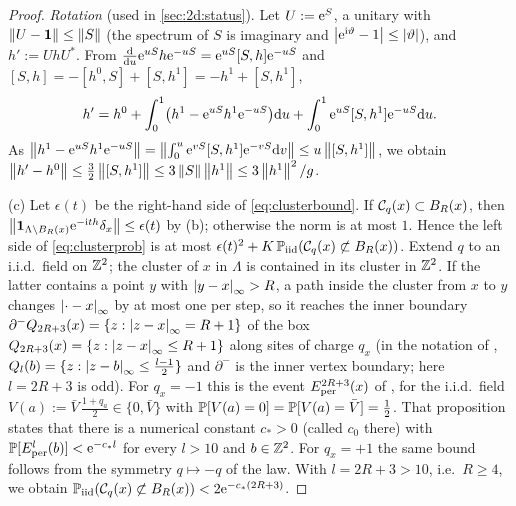 \begin{proof}
\emph{Rotation} (used in \cref{sec:2d:status}).  Let $U:=\mathrm{e}^S$, a unitary with $\left\|U-\mathbf{1}\right\|\le\left\|S\right\|$ (the
spectrum of $S$ is imaginary and $\left|\mathrm{e}^{\mathrm{i}\vartheta}-1\right|\le\left|\vartheta\right|$), and $h':=UhU^*$.  From
$\frac{\mathrm{d}}{\mathrm{d} u}\mathrm{e}^{uS}h\mathrm{e}^{-uS}=\mathrm{e}^{uS}[S,h]\mathrm{e}^{-uS}$ and $[S,h]=-[h^0,S]+[S,h^1]=-h^1+[S,h^1]$,
\[
  h'=h^0+\int_0^1\bigl(h^1-\mathrm{e}^{uS}h^1\mathrm{e}^{-uS}\bigr)\mathrm{d} u+\int_0^1\mathrm{e}^{uS}[S,h^1]\mathrm{e}^{-uS}\mathrm{d} u .
\]
As $\left\|h^1-\mathrm{e}^{uS}h^1\mathrm{e}^{-uS}\right\|=\left\|\int_0^u\mathrm{e}^{vS}[S,h^1]\mathrm{e}^{-vS}\mathrm{d} v\right\|\le u\left\|[S,h^1]\right\|$, we obtain
$\left\|h'-h^0\right\|\le\frac32\left\|[S,h^1]\right\|\le3\left\|S\right\|\left\|h^1\right\|\le3\left\|h^1\right\|^2/g$.

(c) Let $\epsilon(t)$ be the right-hand side of \eqref{eq:clusterbound}.  If $\mathcal{C}_q(x)\subset B_R(x)$, then
$\left\|\mathbf{1}_{\Lambda\setminus B_R(x)}\mathrm{e}^{-\mathrm{i} th}\delta_x\right\|\le\epsilon(t)$ by (b); otherwise the norm is at most $1$.
Hence the left side of \eqref{eq:clusterprob} is at most $\epsilon(t)^2+K\,\mathbb{P}_{\rm iid}(\mathcal{C}_q(x)\not\subset B_R(x))$.
Extend $q$ to an i.i.d.\ field on $\mathbb{Z}^2$; the cluster of $x$ in $\Lambda$ is contained in its cluster in $\mathbb{Z}^2$.
If the latter contains a point $y$ with $\left|y-x\right|_\infty>R$, a path inside the cluster from $x$ to $y$ changes
$\left|\cdot-x\right|_\infty$ by at most one per step, so it reaches the inner boundary
$\partial^-Q_{2R+3}(x)=\{z:\left|z-x\right|_\infty=R+1\}$ of the box $Q_{2R+3}(x)=\{z:\left|z-x\right|_\infty\le R+1\}$
along sites of charge $q_x$ (in the notation of \cite[Eq.~(1.7) and Def.~2.1]{LiL2022}, $Q_l(b)=\{z:\left|z-b\right|_\infty\le\frac{l-1}2\}$
and $\partial^-$ is the inner vertex boundary; here $l=2R+3$ is odd).  For $q_x=-1$ this is the event $E^{2R+3}_{\rm per}(x)$ of \cite[Prop.~2.2]{LiL2022}, for the i.i.d.\
field $V(a):=\bar V\,\frac{1+q_a}2\in\{0,\bar V\}$ with $\mathbb{P}[V(a)=0]=\mathbb{P}[V(a)=\bar V]=\frac12$.  That proposition
states that there is a numerical constant $c_*>0$ (called $c_0$ there) with $\mathbb{P}[E^l_{\rm per}(b)]<\mathrm{e}^{-c_*l}$ for
every $l>10$ and $b\in\mathbb{Z}^2$.  For $q_x=+1$ the same bound follows from the symmetry $q\mapsto-q$ of the law.
With $l=2R+3>10$, i.e.\ $R\ge4$, we obtain $\mathbb{P}_{\rm iid}(\mathcal{C}_q(x)\not\subset B_R(x))<2\mathrm{e}^{-c_*(2R+3)}$.
\end{proof}

